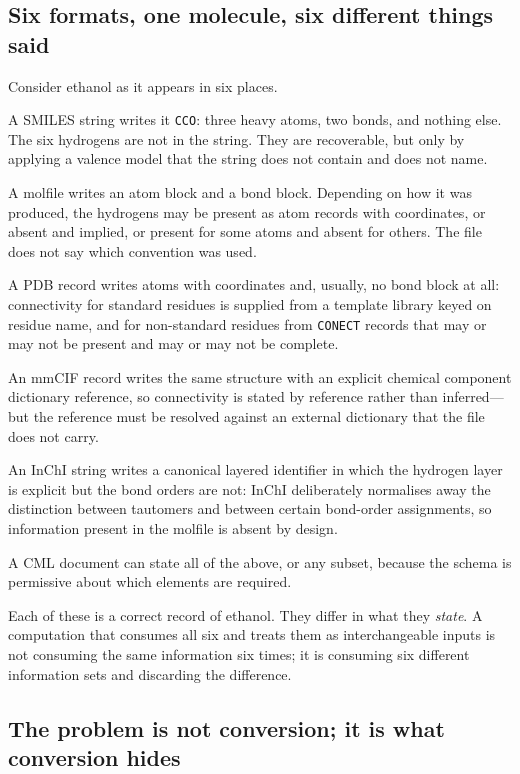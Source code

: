 \documentclass[11pt,twocolumn,a4paper]{article}
\theoremstyle{msthm}
\theoremstyle{definition}
\theoremstyle{remark}
\newcommand{\ms}[1]{\texttt{#1}}
\begin{document}
\subsection{Six formats, one molecule, six different things said}

Consider ethanol as it appears in six places.

A SMILES string \citep{weininger1988smiles,opensmiles} writes it
\ms{CCO}: three heavy atoms, two bonds, and nothing else. The six
hydrogens are not in the string. They are recoverable, but only by
applying a valence model that the string does not contain and does not
name.

A molfile \citep{dalby1992ctfile} writes an atom block and a bond block.
Depending on how it was produced, the hydrogens may be present as atom
records with coordinates, or absent and implied, or present for some
atoms and absent for others. The file does not say which convention was
used.

A PDB record \citep{berman2000pdb} writes atoms with coordinates and,
usually, no bond block at all: connectivity for standard residues is
supplied from a template library keyed on residue name, and for
non-standard residues from \ms{CONECT} records that may or may not be
present and may or may not be complete.

An mmCIF record \citep{westbrook2022pdbx} writes the same structure with
an explicit chemical component dictionary reference, so connectivity is
stated by reference rather than inferred---but the reference must be
resolved against an external dictionary that the file does not carry.

An InChI string \citep{heller2015inchi} writes a canonical layered
identifier in which the hydrogen layer is explicit but the bond orders
are not: InChI deliberately normalises away the distinction between
tautomers and between certain bond-order assignments, so information
present in the molfile is absent by design.

A CML document \citep{murrayrust2011cml} can state all of the above, or
any subset, because the schema is permissive about which elements are
required.

Each of these is a correct record of ethanol. They differ in what they
\emph{state}. A computation that consumes all six and treats them as
interchangeable inputs is not consuming the same information six times;
it is consuming six different information sets and discarding the
difference.

\subsection{The problem is not conversion; it is what conversion hides}
\end{document}
